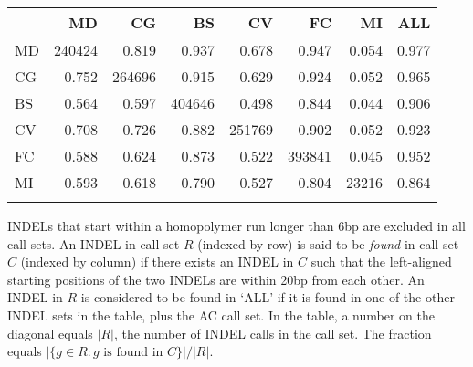 \documentclass{bioinfo}
\begin{document}


\begin{table}[tb]
{%
\begin{tabular}{lrrrrrrr}
\toprule
   &     MD &     CG &     BS &     CV &     FC &     MI &    ALL \\
\midrule
MD & 240424 &  0.819 &  0.937 &  0.678 &  0.947 &  0.054 &  0.977 \\
CG &  0.752 & 264696 &  0.915 &  0.629 &  0.924 &  0.052 &  0.965 \\
BS &  0.564 &  0.597 & 404646 &  0.498 &  0.844 &  0.044 &  0.906 \\
CV &  0.708 &  0.726 &  0.882 & 251769 &  0.902 &  0.052 &  0.923 \\
FC &  0.588 &  0.624 &  0.873 &  0.522 & 393841 &  0.045 &  0.952 \\
MI &  0.593 &  0.618 &  0.790 &  0.527 &  0.804 &  23216 &  0.864 \\
\botrule
\end{tabular}}
{INDELs that start within a homopolymer run longer than 6bp are excluded in all
call sets. An INDEL in call set $R$ (indexed by row) is said to be \emph{found}
in call set $C$ (indexed by column) if there exists an INDEL in $C$ such that
the left-aligned starting positions of the two INDELs are within 20bp from each
other.  An INDEL in $R$ is considered to be found in `ALL' if it is found in
one of the other INDEL sets in the table, plus the AC call set.  In the table,
a number on the diagonal equals $|R|$, the number of INDEL calls in the call
set. The fraction equals $|\{g\in R:g \mbox{ is found in } C\}|/|R|$.}
\end{table}
\end{document}
